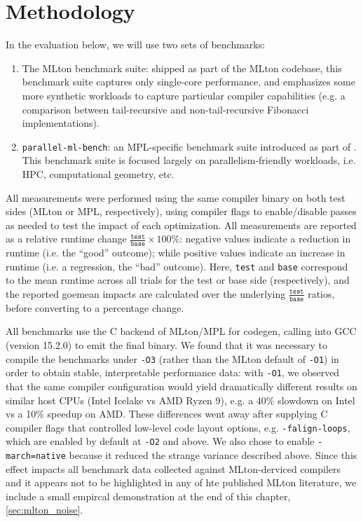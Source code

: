 
\section{Methodology} \label{sec:methodology}
In the evaluation below, we will use two sets of benchmarks:
\begin{enumerate}

\item The MLton benchmark suite: shipped as part of the MLton codebase, this
  benchmark suite captures only single-core performance, and emphasizes some
  more synthetic workloads to capture particular compiler capabilities (e.g. a
  comparison between tail-recursive and non-tail-recursive Fibonacci
  implementations).

\item \texttt{parallel-ml-bench}: an MPL-specific benchmark suite introduced as
  part of \citet{mpl-orig}. This benchmark suite is focused largely on
  parallelism-friendly workloads, i.e. HPC, computational geometry, etc.

\end{enumerate}


All measurements were performed using the same compiler binary on both test
sides (MLton or MPL, respectively), using compiler flags to enable/disable
passes as needed to test the impact of each optimization. All measurements are
reported as a relative runtime change $\frac{\texttt{test}}{\texttt{base}}
\times 100\%$: negative values indicate a reduction in runtime (i.e. the
``good'' outcome); while positive values indicate an increase in runtime (i.e. a
regression, the ``bad'' outcome). Here, \texttt{test} and \texttt{base}
correspond to the mean runtime across all trials for the test or base side
(respectively), and the reported goemean impacts are calculated over the
underlying $\frac{\texttt{test}}{\texttt{base}}$ ratios, before converting to a
percentage change.


All benchmarks use the C backend of MLton/MPL for codegen, calling into GCC
(version 15.2.0) to emit the final binary. We found that it was necessary to
compile the benchmarks under \texttt{-O3} (rather than the MLton default of
\texttt{-O1}) in order to obtain stable, interpretable performance data: with
\texttt{-O1}, we observed that the same compiler configuration would yield
dramatically different results on similar host CPUs (Intel Icelake vs AMD Ryzen
9), e.g. a 40\% slowdown on Intel vs a 10\% speedup on AMD. These differences
went away after supplying C compiler flags that controlled low-level code layout
options, e.g. \texttt{-falign-loops}, which are enabled by default at
\texttt{-O2} and above. We also chose to enable \texttt{-march=native} because
it reduced the strange variance described above. Since this effect impacts all
benchmark data collected against MLton-derviced compilers and it appears not to
be highlighted in any of hte published MLton literature, we include a small
empircal demonstration at the end of this chapter, \cref{sec:mlton_noise}.


